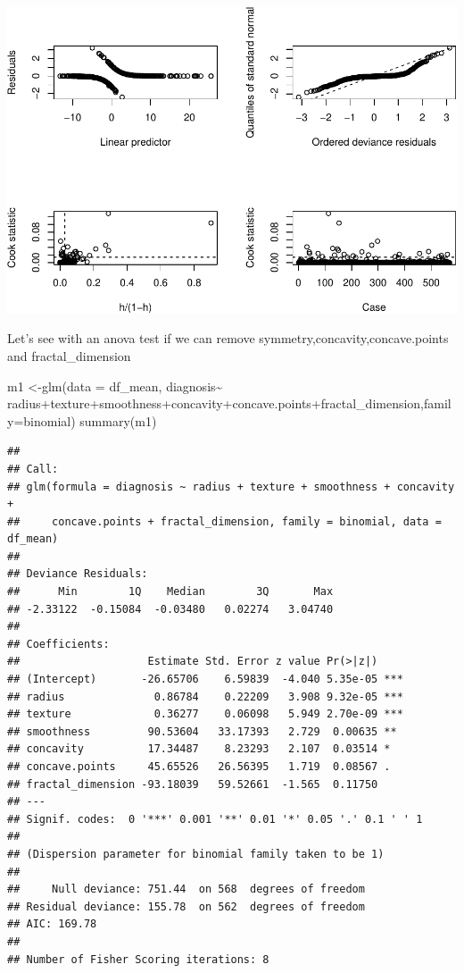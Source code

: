 \documentclass[
  11pt,
]{article}
\newenvironment{Shaded}{\begin{snugshade}}{\end{snugshade}}
\newcommand{\AttributeTok}[1]{\textcolor[rgb]{0.77,0.63,0.00}{#1}}
\newcommand{\FunctionTok}[1]{\textcolor[rgb]{0.00,0.00,0.00}{#1}}
\newcommand{\NormalTok}[1]{#1}
\newcommand{\OtherTok}[1]{\textcolor[rgb]{0.56,0.35,0.01}{#1}}
\newcommand{\SpecialCharTok}[1]{\textcolor[rgb]{0.00,0.00,0.00}{#1}}
\begin{document}
\includegraphics{stat_DAP_files/figure-latex/unnamed-chunk-13-1.pdf}

Let's see with an anova test if we can remove
symmetry,concavity,concave.points and fractal\_dimension

\begin{Shaded}
\begin{Highlighting}[]
\NormalTok{m1 }\OtherTok{\textless{}{-}}\FunctionTok{glm}\NormalTok{(}\AttributeTok{data =}\NormalTok{ df\_mean, diagnosis}\SpecialCharTok{\textasciitilde{}}\NormalTok{ radius}\SpecialCharTok{+}\NormalTok{texture}\SpecialCharTok{+}\NormalTok{smoothness}\SpecialCharTok{+}\NormalTok{concavity}\SpecialCharTok{+}\NormalTok{concave.points}\SpecialCharTok{+}\NormalTok{fractal\_dimension,}\AttributeTok{family=}\NormalTok{binomial)}
\FunctionTok{summary}\NormalTok{(m1)}
\end{Highlighting}
\end{Shaded}

\begin{verbatim}
## 
## Call:
## glm(formula = diagnosis ~ radius + texture + smoothness + concavity + 
##     concave.points + fractal_dimension, family = binomial, data = df_mean)
## 
## Deviance Residuals: 
##      Min        1Q    Median        3Q       Max  
## -2.33122  -0.15084  -0.03480   0.02274   3.04740  
## 
## Coefficients:
##                    Estimate Std. Error z value Pr(>|z|)    
## (Intercept)       -26.65706    6.59839  -4.040 5.35e-05 ***
## radius              0.86784    0.22209   3.908 9.32e-05 ***
## texture             0.36277    0.06098   5.949 2.70e-09 ***
## smoothness         90.53604   33.17393   2.729  0.00635 ** 
## concavity          17.34487    8.23293   2.107  0.03514 *  
## concave.points     45.65526   26.56395   1.719  0.08567 .  
## fractal_dimension -93.18039   59.52661  -1.565  0.11750    
## ---
## Signif. codes:  0 '***' 0.001 '**' 0.01 '*' 0.05 '.' 0.1 ' ' 1
## 
## (Dispersion parameter for binomial family taken to be 1)
## 
##     Null deviance: 751.44  on 568  degrees of freedom
## Residual deviance: 155.78  on 562  degrees of freedom
## AIC: 169.78
## 
## Number of Fisher Scoring iterations: 8
\end{verbatim}
\end{document}
